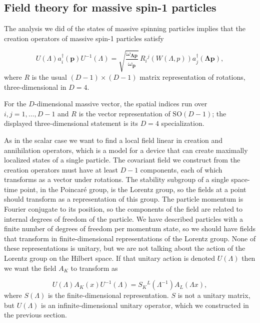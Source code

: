 \subsection{Field theory for massive spin-1 particles}

The analysis we did of the states of massive spinning particles implies that the creation
operators of massive spin-1 particles satisfy

\begin{equation*}
  U(\Lambda)a_i^\dagger(\mathbf p)U^{-1}(\Lambda)
  =\sqrt{\frac{\omega_{\boldsymbol{\Lambda p}}}{\omega_{\mathbf p}}}\,
  R_i{}^j(W(\Lambda,p))a_j^\dagger(\boldsymbol{\Lambda p}),
\end{equation*}
where $R$ is the usual $(D-1)\times(D-1)$ matrix representation of rotations,
three-dimensional in $D=4$.

For the $D$-dimensional massive vector, the spatial indices run over
$i,j=1,\ldots,D-1$ and $R$ is the vector representation of $\mathrm{SO}(D-1)$;
the displayed three-dimensional statement is its $D=4$ specialization.

As in the scalar case we want to find a local field linear in creation and annihilation
operators, which is a model for a device that can create maximally localized states of a
single particle. The covariant field we construct from the creation operators must have at
least $D-1$ components, each of which transforms as a vector under rotations. The
stability subgroup of a single space-time point, in the Poincaré group, is the Lorentz
group, so the fields at a point should transform as a representation of this group. The
particle momentum is Fourier conjugate to its position, so the components of the field
are related to internal degrees of freedom of the particle. We have described particles
with a finite number of degrees of freedom per momentum state, so we should have
fields that transform in finite-dimensional representations of the Lorentz group. None
of these representations is unitary, but we are not talking about the action of the Lorentz
group on the Hilbert space. If that unitary action is denoted $U(\Lambda)$ then we want the
field $A_K$ to transform as

\begin{equation*}
  U(\Lambda)A_K(x)U^{-1}(\Lambda)=S_K{}^L(\Lambda^{-1})A_L(\Lambda x),
\end{equation*}
where $S(\Lambda)$ is the finite-dimensional representation. $S$ is not a unitary matrix, but
$U(\Lambda)$ is an infinite-dimensional unitary operator, which we constructed in the previous
section.


